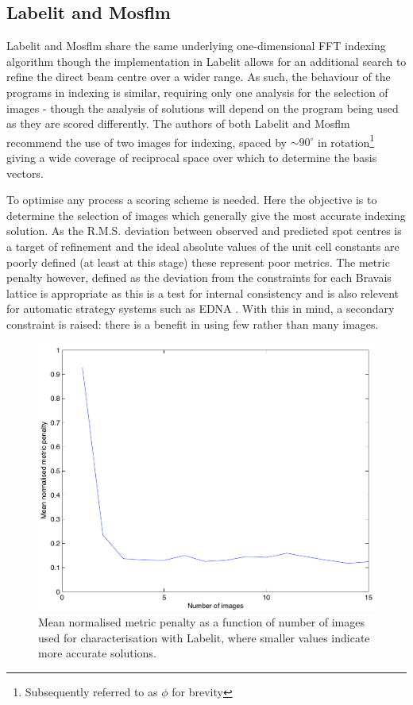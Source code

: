 \documentclass[preprint,pdf]{iucr}
\begin{document}
\subsection{Labelit and Mosflm}

Labelit and Mosflm share the same underlying one-dimensional FFT
indexing algorithm \cite{Steller:mf0013} though the
implementation in Labelit allows for an additional search to refine
the direct beam centre over a wider range. As such, the behaviour of
the programs in indexing is similar, requiring only one analysis for
the selection of images - though the analysis of solutions will depend
on the program being used as they are scored differently.
The authors of both Labelit and Mosflm recommend the use of two images
for indexing, spaced by $\sim 90^{\circ}$ in rotation\footnote{Subsequently
referred to as $\phi$ for brevity} giving a wide coverage of
reciprocal space over which to determine the basis vectors. 

To optimise any process a scoring scheme is needed. Here the objective
is to determine the selection of images which generally give the most
accurate indexing solution. As the R.M.S. deviation between observed
and predicted spot centres is a target of refinement and the ideal absolute
values of the unit cell constants are poorly defined (at least at this
stage) these represent poor metrics. The metric penalty however,
defined as the deviation from the constraints for each Bravais lattice
\cite{Grosse-Kunstleve:sh5006} is appropriate as this is a test for
internal consistency 
and is also relevent for automatic strategy systems such as EDNA
\cite{Incardona:wa5014}. With this in mind, a secondary constraint is raised:
there is a benefit in using few rather than many images.

\begin{figure}
\caption{Mean normalised metric penalty as a function of number of
  images used for characterisation with Labelit, where smaller values
  indicate more accurate solutions.
\label{figure:no_images}}
\centering
\includegraphics[scale=0.5]{figures/no_images.pdf}
\end{figure}
\end{document}
